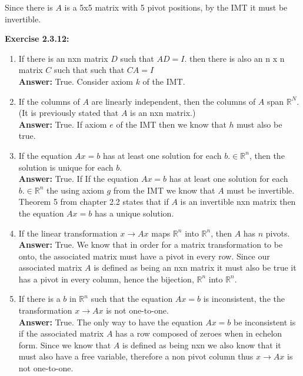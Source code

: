 \documentclass{amsart}
\def\RR{{\mathbb R}}
\begin{document}
Since there is $A$ is a 5x5 matrix with 5 pivot positions, by the IMT it must be invertible. 

\vspace{1in}


\noindent\textbf{Exercise 2.3.12: } 


\begin{enumerate}
\item If there is an nxn matrix $D$ such that $AD = I$. then there is also an n x n matrix $C$ such that such that $CA = I$\\
\noindent \textbf{Answer: } True. Consider axiom $k$ of the IMT.
\vspace{1in}




\item If the columns of $A$ are linearly independent, then the columns of $A$ span $\RR^{N}$.(It is previously stated that $A$ is an nxn matrix.)\\
\noindent \textbf{Answer: } True. If axiom $e$ of the IMT then we know that $h$ must also be true.
\vspace{1in}


\item If the equation $Ax = b$ has at least one solution for each $b. \in \RR^{n}$, then the solution is unique for each $b$.\\
\noindent \textbf{Answer: } True. If If the equation $Ax = b$ has at least one solution for each $b. \in \RR^{n}$ the using axiom $g$ from the IMT we know that $A$ must be invertible. Theorem 5 from chapter 2.2 states that if $A$ is an invertible nxn matrix then the equation $Ax = b$ has a unique solution.
\vspace{1in}


\item If the linear transformation $x \to Ax$ maps $\RR^{n}$ into $\RR^{n}$, then $A$ has $n$ pivots.\\  
\noindent \textbf{Answer: }True. We know that in order for a matrix transformation to be onto, the associated matrix must have a pivot in every row. Since our associated matrix $A$ is defined as being an nxn matrix it must also be true it has a pivot in every column, hence the bijection,  $\RR^{n}$ into $\RR^{n}$.
\vspace{1in}


\item If there is a $b$ in  $\RR^{n}$ such that the equation $Ax = b$ is inconsistent, the the transformation $x \to Ax$ is not one-to-one.\\
\noindent \textbf{Answer: } True. The only way to have the equation $Ax = b$ be inconsistent is if the associated matrix $A$ has a row composed of zeroes when in echelon form. Since we know that $A$ is defined as being nxn we also know that it must also have a free variable, therefore a non pivot column thus $x \to Ax$ is not one-to-one.
\vspace{1in}
\end{enumerate}
\end{document}
